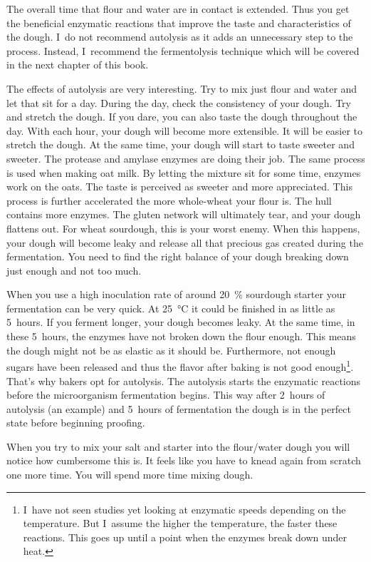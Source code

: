 The overall time that flour and water are in contact is extended. Thus you get the
beneficial enzymatic reactions that improve the taste and characteristics of the
dough. I~do not recommend autolysis as it adds an unnecessary step to the
process. Instead, I~recommend the fermentolysis technique which will be covered in the
next chapter of this book.

The effects of autolysis are very interesting. Try to mix just flour and
water and let that sit for a day. During the day, check the consistency of
your dough. Try and stretch the dough. If you dare, you can also taste the
dough throughout the day. With each hour, your dough will become
more extensible. It will be easier to stretch the dough. At the same time, your
dough will start to taste sweeter and sweeter. The protease and amylase enzymes
are doing their job. The same process is used when making oat milk. By letting
the mixture sit for some time, enzymes work on the oats. The taste is perceived as
sweeter and more appreciated. This process is further accelerated the more
whole-wheat your flour is. The hull contains more enzymes. The gluten network
will ultimately tear, and your dough flattens out. For wheat sourdough, this is
your worst enemy. When this happens, your dough will become leaky and release
all that precious gas created during the fermentation. You need to find the
right balance of your dough breaking down just enough and not too much.

When you use a high inoculation rate of around \qty{20}{\percent} sourdough starter
your fermentation can be very quick. At \qty{25}{\degreeCelsius} it could be finished in as little as 5~hours.
If you ferment longer, your dough becomes leaky. At the same time, in
these 5~hours, the enzymes have not broken down the flour enough. This means
the dough might not be as elastic as it should be. Furthermore, not enough
sugars have been released and thus the flavor after baking is not good
enough\footnote{I~have not seen studies yet looking at enzymatic speeds depending on
the temperature. But I~assume the higher the temperature, the faster these
reactions. This goes up until a point when the enzymes break down under
heat.}. That's why bakers opt for autolysis. The autolysis starts the enzymatic
reactions before the microorganism fermentation begins. This way after 2~hours
of autolysis (an example) and 5~hours of fermentation the dough is in the
perfect state before beginning proofing.

When you try to mix your salt and starter into the flour/water dough you will
notice how cumbersome this is. It feels like you have to knead again from scratch
one more time. You will spend more time mixing dough.

